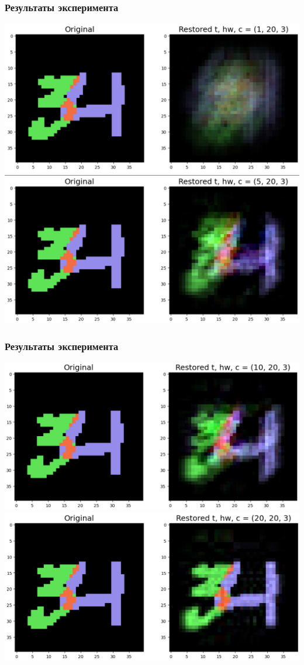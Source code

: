 \documentclass[10pt]{beamer}
\begin{document}
\begin{frame}
	\frametitle{Результаты эксперимента}
		\centering
		\includegraphics[scale=0.35]{./res1_20_3.png}
		\includegraphics[scale=0.35]{./res5_20_3.png}
\end{frame}

\begin{frame}
	\frametitle{Результаты эксперимента}
	\centering
	\includegraphics[scale=0.35]{./res10_20_3.png}
	\includegraphics[scale=0.35]{./res20_20_3.png}
\end{frame}
\end{document}
